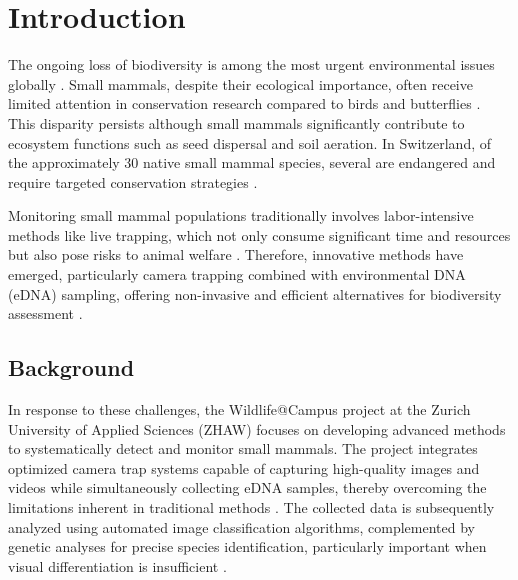 

\section{Introduction}
\label{introduction}

The ongoing loss of biodiversity is among the most urgent environmental issues globally \autocite{brondizioGlobalAssessmentReport2019, cardinaleBiodiversityLossIts2012}.
Small mammals, despite their ecological importance, often receive limited attention in conservation research compared to birds and butterflies \autocite{grafWildlifeCampusKleineSaeugetiere2022}.
This disparity persists although small mammals significantly contribute to ecosystem functions such as seed dispersal and soil aeration.
In Switzerland, of the approximately 30 native small mammal species, several are endangered and require targeted conservation strategies \autocite{bafuListeNationalPrioritaren2019}.

Monitoring small mammal populations traditionally involves labor-intensive methods like live trapping, which not only consume significant time and resources but also pose risks to animal welfare \autocite{grafWildlifeCampusKleineSaeugetiere2022}.
Therefore, innovative methods have emerged, particularly camera trapping combined with environmental DNA (eDNA) sampling, offering non-invasive and efficient alternatives for biodiversity assessment \autocite{aegerterMonitoringKleinmustelidenSchlaefern2019}.

\subsection{Background}

In response to these challenges, the Wildlife@Campus project at the Zurich University of Applied Sciences (ZHAW) focuses on developing advanced methods to systematically detect and monitor small mammals.
The project integrates optimized camera trap systems capable of capturing high-quality images and videos while simultaneously collecting eDNA samples, thereby overcoming the limitations inherent in traditional methods \autocite{grafWildlifeCampusKleineSaeugetiere2022}.
The collected data is subsequently analyzed using automated image classification algorithms, complemented by genetic analyses for precise species identification, particularly important when visual differentiation is insufficient \autocite{ratnaweeraWildlifeCampusProgressReports2021}.

